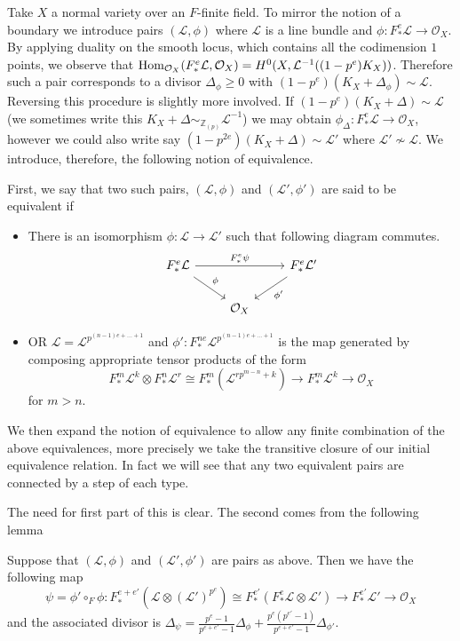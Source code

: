 \documentclass[a4paper,12pt]{book}
\newcommand{\Hom}{\textup{Hom}}
\newcommand{\Fe}[1][e]{F^{#1}_{*}}
\newcommand{\ox}[1][X]{\mathcal{O}_{#1}}
\newcommand{\zp}{\mathbb{Z}_{(p)}}
\begin{document}
Take $X$ a normal variety over an $F$-finite field. To mirror the notion of a boundary we introduce pairs $(\mathcal{L}, \phi)$ where $\mathcal{L}$ is a line bundle and $\phi: \Fe \mathcal{L} \to \ox$. By applying duality on the smooth locus, which contains all the codimension $1$ points, we observe that $\Hom_{\ox}(\Fe \mathcal{L},\ox)=H^{0}(X,\mathcal{L}^{-1}((1-p^{e})K_{X}))$. Therefore such a pair corresponds to a divisor $\Delta_{\phi} \geq 0$ with $(1-p^{e})(K_{X}+\Delta_{\phi}) \sim \mathcal{L}$. Reversing this procedure is slightly more involved. If ${(1-p^{e})(K_{X}+\Delta) \sim \mathcal{L}}$ (we sometimes write this $K_{X}+\Delta \sim_{\zp} \mathcal{L}^{-1}$) we may obtain $\phi_{\Delta}:\Fe \mathcal{L} \to \ox$, however we could also write say $(1-p^{2e})(K_{X}+\Delta) \sim \mathcal{L'}$ where $\mathcal{L'} \not\sim \mathcal{L}$. We introduce, therefore, the following notion of equivalence.

First, we say that two such pairs, $(\mathcal{L}, \phi)$ and $(\mathcal{L}', \phi')$ are said to be equivalent if

\begin{itemize}
	\item There is an isomorphism $\phi: \mathcal{L} \to \mathcal{L'}$ such that following diagram commutes.
	\[\begin{tikzcd}
	\Fe \mathcal{L} \arrow[rd, "\phi"] \arrow[rr, "\Fe \psi"] &     & \Fe \mathcal{L}' \arrow[ld, "\phi'"] \\
	& \ox &                                     
	\end{tikzcd}\]
	\item OR $\mathcal{L}=\mathcal{L}^{p^{(n-1)e+...+1}}$ and $\phi':F_{*}^{ne}\mathcal{L}^{p^{(n-1)e+...+1}}$ is the map generated by composing appropriate tensor products of the form $$F_{*}^{m}\mathcal{L}^{k} \otimes F_{*}^{n} \mathcal{L}^{r}\cong F_{*}^{m}(\mathcal{L}^{rp^{m-n}+k}) \to F^{m}_{*}\mathcal{L}^{k}\to \ox$$ for $m>n$.
\end{itemize}

We then expand the notion of equivalence to allow any finite combination of the above equivalences, more precisely we take the transitive closure of our initial equivalence relation. In fact we will see that any two equivalent pairs are connected by a step of each type.

The need for first part of this is clear. The second comes from the following lemma

\begin{lemma}\label{twist}
	Suppose that $(\mathcal{L},\phi)$ and $(\mathcal{L}',\phi')$ are pairs as above. Then we have the following map
	\[\psi= \phi' \circ_{F} \phi: F^{e+e'}_{*}(\mathcal{L}\otimes (\mathcal{L}')^{p^{e}})\cong F_{*}^{e'}(\Fe \mathcal{L} \otimes \mathcal{L}')\to F^{e'}_{*}\mathcal{L}'\to \ox \]
	and the associated divisor is $\Delta_{\psi}= \frac{p^{e}-1}{p^{e+e'}-1}\Delta_{\phi} + \frac{p^{e}(p^{e'}-1)}{p^{e+e'}-1}\Delta_{\phi'}$.

\end{lemma}
\end{document}

